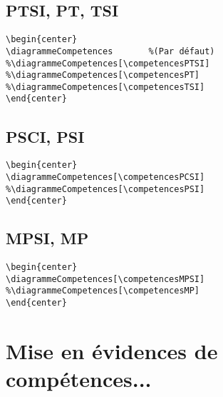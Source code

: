 \documentclass[a4paper,12pt]{article}
\begin{document}
		\subsection{PTSI, PT, TSI}


			\begin{verbatim}
\begin{center}
\diagrammeCompetences		%(Par défaut)
%\diagrammeCompetences[\competencesPTSI]
%\diagrammeCompetences[\competencesPT]
%\diagrammeCompetences[\competencesTSI]
\end{center}
			\end{verbatim}

			\begin{center}
				\diagrammeCompetences
			\end{center}


		\subsection{PSCI, PSI}

			\begin{verbatim}
\begin{center}
\diagrammeCompetences[\competencesPCSI]
%\diagrammeCompetences[\competencesPSI]
\end{center}
			\end{verbatim}

			\begin{center}
				\diagrammeCompetences[\competencesPSI]
			\end{center}

		\subsection{MPSI, MP}

			\begin{verbatim}
\begin{center}
\diagrammeCompetences[\competencesMPSI]
%\diagrammeCompetences[\competencesMP]
\end{center}
			\end{verbatim}

			\begin{center}
				\diagrammeCompetences[\competencesMP]
			\end{center}




	\section{Mise en évidences de compétences...}
\end{document}
